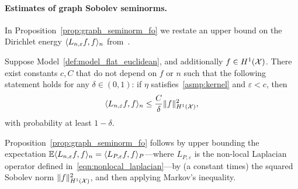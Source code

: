 \paragraph{Estimates of graph Sobolev seminorms.}
In Proposition~\ref{prop:graph_seminorm_fo} we restate an upper bound on the Dirichlet energy $\langle L_{n,\varepsilon}f, f \rangle_n$ from~\cite{green2021}. 
\begin{proposition}
	\label{prop:graph_seminorm_fo}
	Suppose Model~\ref{def:model_flat_euclidean}, and additionally $f \in H^1(\mathcal{X})$. There exist constants $c,C$ that do not depend on $f$ or $n$ such that the following statement holds for any $\delta \in (0,1)$: if $\eta$ satisfies~\ref{asmp:kernel} and $\varepsilon < c$, then
	\begin{equation}
	\label{eqn:graph_seminorm_fo}
	\langle L_{n,\varepsilon}f, f \rangle_n \leq \frac{C}{\delta} \|f\|_{H^1(\mathcal{X})}^2,
	\end{equation}
	with probability at least $1 - \delta$.
\end{proposition}
Proposition~\ref{prop:graph_seminorm_fo} follows by upper bounding the expectation $\mathbb{E}\langle L_{n,\varepsilon}f, f \rangle_n = \langle L_{P,\varepsilon}f, f \rangle_P$---where $L_{P,\varepsilon}$ is the non-local Laplacian operator defined in~\eqref{eqn:nonlocal_laplacian}---by (a constant times) the squared Sobolev norm $\|f\|_{H^1(\mathcal{X})}^2$, and then applying Markov's inequality.

